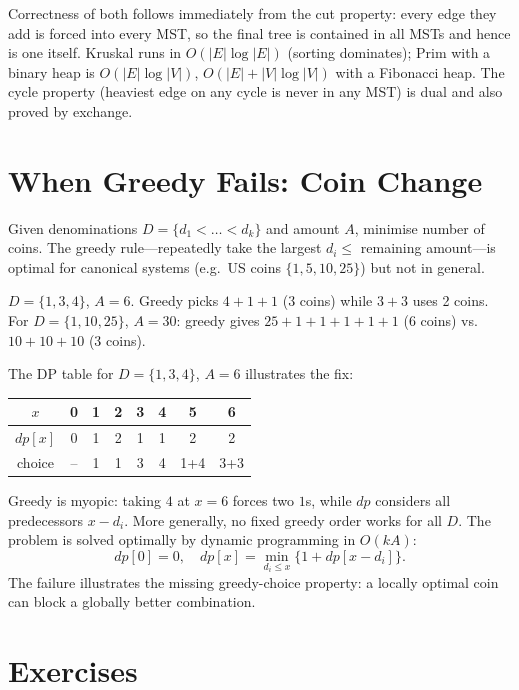 Correctness of both follows immediately from the cut property: every edge they add is forced into every MST, so the final tree is contained in all MSTs and hence is one itself. Kruskal runs in $O(|E|\log|E|)$ (sorting dominates); Prim with a binary heap is $O(|E|\log|V|)$, $O(|E|+|V|\log|V|)$ with a Fibonacci heap. The cycle property (heaviest edge on any cycle is never in any MST) is dual and also proved by exchange.

\section{When Greedy Fails: Coin Change}
\label{sec:coin-change}

Given denominations $D=\{d_1<\dots<d_k\}$ and amount $A$, minimise number of coins. The greedy rule---repeatedly take the largest $d_i\le$ remaining amount---is optimal for canonical systems (e.g.\ US coins $\{1,5,10,25\}$) but not in general.

\begin{example}[Counterexample]
$D=\{1,3,4\}$, $A=6$. Greedy picks $4+1+1$ (3 coins) while $3+3$ uses 2 coins. For $D=\{1,10,25\}$, $A=30$: greedy gives $25+1+1+1+1+1$ (6 coins) vs.\ $10+10+10$ (3 coins).
\end{example}

The DP table for $D=\{1,3,4\}$, $A=6$ illustrates the fix:
\begin{center}
\begin{tabular}{c|ccccccc}
$x$ & 0 & 1 & 2 & 3 & 4 & 5 & 6\\\hline
$dp[x]$ & 0 & 1 & 2 & 1 & 1 & 2 & 2\\
choice & -- & 1 & 1 & 3 & 4 & 1+4 & 3+3
\end{tabular}
\end{center}
Greedy is myopic: taking $4$ at $x=6$ forces two $1$s, while $dp$ considers all predecessors $x-d_i$.
More generally, no fixed greedy order works for all $D$. The problem is solved optimally by dynamic programming in $O(kA)$:
\[ dp[0]=0,\quad dp[x]=\min_{d_i\le x}\{1+dp[x-d_i]\}. \]
The failure illustrates the missing greedy-choice property: a locally optimal coin can block a globally better combination.

\section{Exercises}
\label{sec:greedy-exercises}

